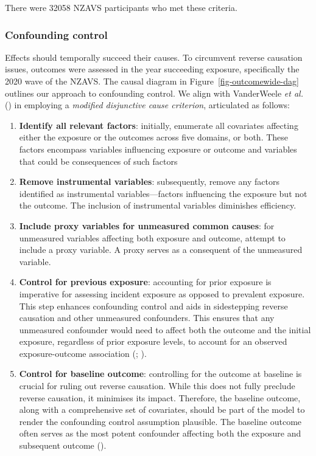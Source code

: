 \documentclass[
  singlecolumn]{article}
\begin{document}
There were 32058 NZAVS participants who met these criteria.

\subsubsection{Confounding control}\label{confounding-control}

Effects should temporally succeed their causes. To circumvent reverse
causation issues, outcomes were assessed in the year succeeding
exposure, specifically the 2020 wave of the NZAVS. The causal diagram in
Figure~\ref{fig-outcomewide-dag} outlines our approach to confounding
control. We align with VanderWeele \emph{et al.}
() in employing a \emph{modified
disjunctive cause criterion}, articulated as follows:

\begin{enumerate}
\def\labelenumi{\arabic{enumi}.}
\item
  \textbf{Identify all relevant factors}: initially, enumerate all
  covariates affecting either the exposure or the outcomes across five
  domains, or both. These factors encompass variables influencing
  exposure or outcome and variables that could be consequences of such
  factors
\item
  \textbf{Remove instrumental variables}: subsequently, remove any
  factors identified as instrumental variables---factors influencing the
  exposure but not the outcome. The inclusion of instrumental variables
  diminishes efficiency.
\item
  \textbf{Include proxy variables for unmeasured common causes}: for
  unmeasured variables affecting both exposure and outcome, attempt to
  include a proxy variable. A proxy serves as a consequent of the
  unmeasured variable.
\item
  \textbf{Control for previous exposure}: accounting for prior exposure
  is imperative for assessing incident exposure as opposed to prevalent
  exposure. This step enhances confounding control and aids in
  sidestepping reverse causation and other unmeasured confounders. This
  ensures that any unmeasured confounder would need to affect both the
  outcome and the initial exposure, regardless of prior exposure levels,
  to account for an observed exposure-outcome association
  (;
  ).
\item
  \textbf{Control for baseline outcome}: controlling for the outcome at
  baseline is crucial for ruling out reverse causation. While this does
  not fully preclude reverse causation, it minimises its impact.
  Therefore, the baseline outcome, along with a comprehensive set of
  covariates, should be part of the model to render the confounding
  control assumption plausible. The baseline outcome often serves as the
  most potent confounder affecting both the exposure and subsequent
  outcome ().
\end{enumerate}
\end{document}
